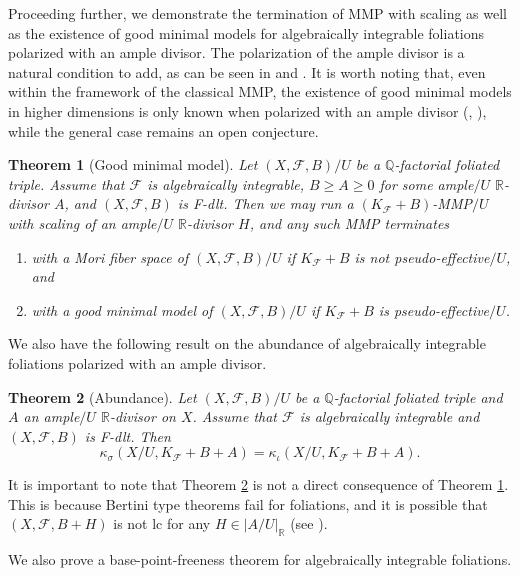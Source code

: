 \documentclass[11pt]{amsart}
\numberwithin{equation}{section}
\newcommand{\Qq}{\mathbb{Q}}
\newcommand{\Rr}{\mathbb{R}}
\newcommand{\Ff}{\mathcal{F}}
\newtheorem{thm}{Theorem}[subsection]
\theoremstyle{definition}
\theoremstyle{definition}
\theoremstyle{definition}
\begin{document}
Proceeding further, we demonstrate the termination of MMP with scaling as well as the existence of good minimal models for algebraically integrable foliations polarized with an ample divisor. The polarization of the ample divisor is a natural condition to add, as can be seen in \cite[Theorem 1.2]{CS21} and \cite[Theorem 1.3]{CS20}. It is worth noting that, even within the framework of the classical MMP, the existence of good minimal models in higher dimensions is only known when polarized with an ample divisor (\cite[Theorem C]{BCHM10}, \cite[Theorem 1.5]{HH20}),  while the general case remains an open conjecture.


\begin{thm}[Good minimal model]\label{thm: +a gmm fdlt}
    Let $(X,\Ff,B)/U$ be a $\Qq$-factorial foliated triple. Assume that $\Ff$ is algebraically integrable, $B\geq A\geq 0$ for some ample$/U$ $\Rr$-divisor $A$, and $(X,\Ff,B)$ is F-dlt. Then we may run a $(K_{\Ff}+B)$-MMP$/U$ with scaling of an ample$/U$ $\Rr$-divisor $H$, and any such MMP terminates 
    \begin{enumerate}
        \item with a Mori fiber space of $(X,\Ff,B)/U$ if $K_{\Ff}+B$ is not pseudo-effective$/U$, and
        \item with a good minimal model of $(X,\Ff,B)/U$ if $K_{\Ff}+B$ is pseudo-effective$/U$.
    \end{enumerate}
\end{thm}


We also have the following result on the abundance of algebraically integrable foliations polarized with an ample divisor.

\begin{thm}[Abundance]\label{thm: +a abundance fdlt}
  Let $(X,\Ff,B)/U$ be a $\Qq$-factorial foliated triple and $A$ an ample$/U$ $\Rr$-divisor on $X$.  Assume that $\Ff$ is algebraically integrable and $(X,\Ff,B)$ is F-dlt. Then 
  $$\kappa_{\sigma}(X/U,K_{\Ff}+B+A)=\kappa_{\iota}(X/U,K_{\Ff}+B+A).$$
\end{thm}

It is important to note that Theorem \ref{thm: +a abundance fdlt} is not a direct consequence of Theorem \ref{thm: +a gmm fdlt}. This is because Bertini type theorems fail for foliations, and it is possible that $(X,\Ff,B+H)$ is not lc for any $H\in |A/U|_{\mathbb R}$ (see \cite[Example 3.4]{DLM23}).

We also prove a base-point-freeness theorem for algebraically integrable foliations.
\end{document}
